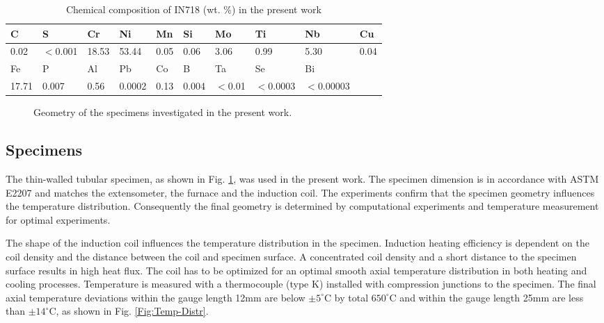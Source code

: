 \documentclass[preprint,5p,twocolumn,11pt,sort&compress]{elsarticle}
\begin{document}
\begin{table*}[htbp]
  \centering
  \caption{Chemical composition of IN718 (wt. \%) in the present work}\vspace{0.1cm}
    \begin{tabular}{llllllllll}
    \hline
    C     & S     & Cr    & Ni    & Mn    & Si    & Mo    & Ti    & Nb    & Cu \\
    \hline
    0.02  & $<$0.001 & 18.53 & 53.44 & 0.05  & 0.06  & 3.06  & 0.99  & 5.30  & 0.04 \\
    \hline
    Fe    & P     & Al    & Pb    & Co    & B     & Ta    & Se    & Bi    &  \\
    \hline
    17.71 & 0.007 & 0.56  & 0.0002 & 0.13  & 0.004 & $<$0.01 & $<$0.0003 & $<$0.00003 &  \\
    \hline
    \end{tabular}%
  \label{Tab:ChemicalCompositionofIN718}%
\end{table*}%


\begin{figure}[!htp]
\caption{Geometry of the specimens investigated in the present work.}
\label{Fig:Specimen}
\end{figure}

\subsection{Specimens}
The thin-walled tubular specimen, as shown in Fig. \ref{Fig:Specimen}, was used in the present work. The specimen dimension is in accordance with ASTM E2207 \cite{ASTM2014} and matches the extensometer, the furnace and the induction coil. The experiments confirm that the specimen geometry influences the temperature distribution. Consequently the final geometry is determined by computational experiments and temperature measurement for optimal experiments.

The shape of the induction coil influences the temperature distribution in the specimen. Induction heating efficiency is dependent on the coil density and the distance between the coil and specimen surface. A concentrated coil density and a short distance to the specimen surface results in high heat flux. The coil has to be optimized for an optimal smooth axial temperature distribution in both heating and cooling processes. Temperature is measured with a thermocouple (type K) installed with compression junctions to the specimen. The final axial temperature deviations within the gauge length 12mm are below $\pm5^\circ$C by total $650^\circ$C and within the gauge length 25mm are less than $\pm14^\circ$C, as shown in Fig. \ref{Fig:Temp-Distr}.
\end{document}
